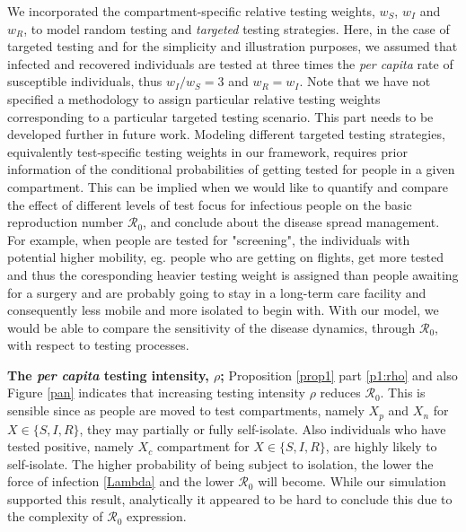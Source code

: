 \documentclass[12pt]{article}
\newcommand{\percap}{\emph{per capita}\xspace}
\newcommand{\Rnum}{\ensuremath{\mathcal{R}_0}}
\DeclareRobustCommand\_{\ifmmode\expandafter\subtxt\else\textunderscore\fi}
\theoremstyle{definition} %
\begin{document}
We incorporated the compartment-specific relative testing weights, $w_S$, $w_I$ and $w_R$, to model random testing and \emph{targeted} testing strategies. Here, in the case of targeted testing and for the simplicity and illustration purposes, we assumed that infected and recovered individuals are tested at three times the \percap rate of susceptible individuals, thus $w_I/w_S=3$ and $w_R=w_I$. Note that we have not specified a methodology to assign particular relative testing weights corresponding to a particular targeted testing scenario. 
This part needs to be developed further in future work. 
Modeling different targeted testing strategies, equivalently test-specific testing weights in our framework, requires prior information of the conditional probabilities of getting tested for people in a given compartment. 
This can be implied when we would like to quantify and compare the effect of different levels of test focus for infectious people on the basic reproduction number $\Rnum$, and conclude about the disease spread management. For example, when people are tested for "screening", the individuals with potential higher mobility, eg. people who are getting on flights, get more tested and thus the coresponding heavier testing weight is assigned than people awaiting for a surgery and are probably going to stay in a long-term care facility and consequently less mobile and more isolated to begin with. With our model, we would be able to compare the sensitivity of the disease dynamics, through $\Rnum$, with respect to testing processes.

{\bf The \percap testing intensity, $\rho$;}
Proposition \ref{prop1} part \ref{p1:rho} and also Figure \ref{pan} indicates that increasing testing intensity $\rho$ reduces $\Rnum$. This is sensible since as people are moved to test compartments, namely $X_p$ and $X_n$ for $X \in \{S,I,R\}$, they may partially or fully self-isolate. Also individuals who have tested positive, namely $X_c$ compartment for $X \in \{S,I,R\}$, are highly likely to self-isolate. The higher probability of being subject to isolation, the lower the force of infection \eqref{Lambda} and the lower $\Rnum$ will become. While our simulation supported this result, analytically it appeared to be hard to conclude this due to the complexity of $\Rnum$ expression.  
\end{document}
